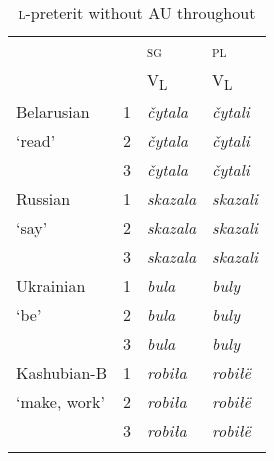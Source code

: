 \documentclass[output=paper]{langscibook}
\begin{document}
\begin{table}
\begin{tabular}{llll}
\lsptoprule
& & \textsc{sg} & \textsc{pl} \\ 
& & V\textsubscript{L} & V\textsubscript{L} \\
\midrule
Belarusian & 1 & \textit{čytala} & \textit{čytali} \\ 
`read'    & 2 & \textit{čytala} & \textit{čytali} \\ 
    & 3 & \textit{čytala} & \textit{čytali} \\\addlinespace
Russian & 1 & \textit{skazala} & \textit{skazali} \\ 
`say'            & 2 & \textit{skazala} & \textit{skazali} \\ 
            & 3 & \textit{skazala} & \textit{skazali} \\\addlinespace
Ukrainian & 1 & \textit{bula} & \textit{buly} \\ 
`be'            & 2 & \textit{bula} & \textit{buly} \\ 
            & 3 & \textit{bula} & \textit{buly} \\\addlinespace
Kashubian-B & 1 & \textit{robiła} & \textit{robiłë} \\ 
`make, work'            & 2 & \textit{robiła} & \textit{robiłë} \\ 
            & 3 & \textit{robiła} & \textit{robiłë} \\ 
\lspbottomrule
\end{tabular}
    \caption{\textsc{l-}preterit without AU throughout}
    \label{pitsch:tab:perfect_none}
\end{table}

\end{document}
